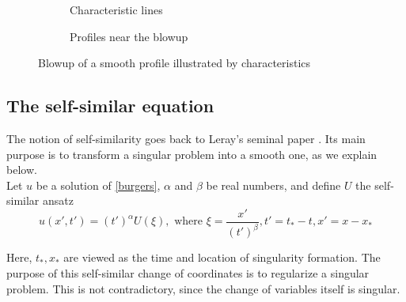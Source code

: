 \documentclass[11pt,a4paper]{article}
\begin{document}
\begin{figure}[ht]
\begin{subfigure}[b]{0.32\textwidth}
    \caption{Characteristic lines}
  \end{subfigure}\hfill
  \begin{subfigure}[b]{0.32\textwidth}
    \caption{Profiles near the blowup}
  \end{subfigure}
  \caption{Blowup of a smooth profile illustrated by characteristics \cite{eggers2015singularities}}
\end{figure}


\subsection{The self-similar equation}
The notion of self-similarity goes back to Leray's seminal paper \cite{leray1934}. Its main purpose is to transform a singular problem into a smooth one, as we explain below. \\

\noindent Let $u$ be a solution of \eqref{burgers}, $\alpha$ and $\beta$ be real numbers, and define $U$ the self-similar ansatz
\begin{equation}
    u(x', t') = (t')^\alpha U(\xi), \text{ where }\xi = \frac{x'}{(t')^\beta}, t' = t_* - t, x'=x-x_*
\end{equation}

Here, $t_*, x_*$ are viewed as the time and location of singularity formation. The purpose of this self-similar change of coordinates is to regularize a singular problem. This is not contradictory, since the change of variables itself is singular. \\
\end{document}
